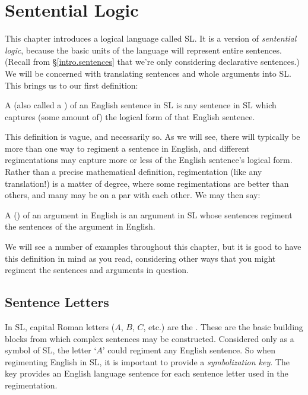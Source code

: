 \chapter{Sentential Logic}
\label{ch.SL}




This chapter introduces a logical language called SL.
It is a version of \emph{sentential logic}, because the basic units of the language will represent entire sentences.
(Recall from \S\ref{intro.sentences} that we're only considering declarative sentences.)
We will be concerned with translating sentences and whole arguments into SL.
This brings us to our first definition: 
  
A  (also called a ) of an English sentence in SL is any sentence in SL which captures (some amount of) the logical form of that English sentence.

This definition is vague, and necessarily so.
As we will see, there will typically be more than one way to regiment a sentence in English, and different regimentations may capture more or less of the English sentence's logical form.
Rather than a precise mathematical definition, regimentation (like any translation!) is a matter of degree, where some regimentations are better than others, and many may be on a par with each other.
We may then say:

A  () of an argument in English is an argument in SL whose sentences regiment the sentences of the argument in English.

We will see a number of examples throughout this chapter, but it is good to have this definition in mind as you read, considering other ways that you might regiment the sentences and arguments in question.




\section{Sentence Letters}

In SL, capital Roman letters ($A$, $B$, $C$, etc.) are the .
These are the basic building blocks from which complex sentences may be constructed.
Considered only as a symbol of SL, the letter `$A$' could regiment any English sentence.
So when regimenting English in SL, it is important to provide a \emph{symbolization key}.
The key provides an English language sentence for each sentence letter used in the regimentation.

